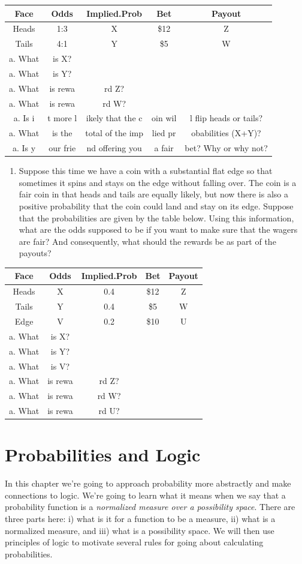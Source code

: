 \documentclass[]{tufte-book}
\providecommand{\tightlist}{%
  \setlength{\itemsep}{0pt}\setlength{\parskip}{0pt}}
\begin{document}
\begin{longtable}[]{@{}ccccc@{}}
\toprule
Face & Odds & Implied.Prob & Bet & Payout\tabularnewline
\midrule
\endhead
Heads & 1:3 & X & \$12 & Z\tabularnewline
Tails & 4:1 & Y & \$5 & W\tabularnewline
a. What & is X? & & &\tabularnewline
a. What & is Y? & & &\tabularnewline
a. What & is rewa & rd Z? & &\tabularnewline
a. What & is rewa & rd W? & &\tabularnewline
a. Is i & t more l & ikely that the c & oin wil & l flip heads or tails?\tabularnewline
a. What & is the & total of the imp & lied pr & obabilities (X+Y)?\tabularnewline
a. Is y & our frie & nd offering you & a fair & bet? Why or why not?\tabularnewline
\bottomrule
\end{longtable}

\begin{enumerate}
\def\labelenumi{\arabic{enumi}.}
\setcounter{enumi}{1}
\tightlist
\item
  Suppose this time we have a coin with a substantial flat edge so that sometimes it spins and stays on the edge without falling over. The coin is a fair coin in that heads and tails are equally likely, but now there is also a positive probability that the coin could land and stay on its edge. Suppose that the probabilities are given by the table below. Using this information, what are the odds supposed to be if you want to make sure that the wagers are fair? And consequently, what should the rewards be as part of the payouts?
\end{enumerate}

\begin{longtable}[]{@{}ccccc@{}}
\toprule
Face & Odds & Implied.Prob & Bet & Payout\tabularnewline
\midrule
\endhead
Heads & X & 0.4 & \$12 & Z\tabularnewline
Tails & Y & 0.4 & \$5 & W\tabularnewline
Edge & V & 0.2 & \$10 & U\tabularnewline
a. What & is X? & & &\tabularnewline
a. What & is Y? & & &\tabularnewline
a. What & is V? & & &\tabularnewline
a. What & is rewa & rd Z? & &\tabularnewline
a. What & is rewa & rd W? & &\tabularnewline
a. What & is rewa & rd U? & &\tabularnewline
\bottomrule
\end{longtable}

\hypertarget{probabilities-and-logic}{%
\chapter{Probabilities and Logic}\label{probabilities-and-logic}}

In this chapter we're going to approach probability more abstractly and make connections to logic. We're going to learn what it means when we say that a probability function is a \emph{normalized measure over a possibility space}. There are three parts here: i) what is it for a function to be a measure, ii) what is a normalized measure, and iii) what is a possibility space. We will then use principles of logic to motivate several rules for going about calculating probabilities.
\end{document}
